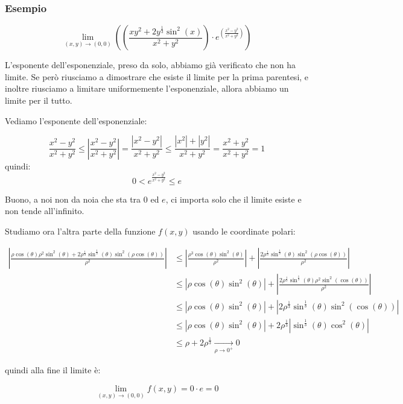 \subsubsection*{Esempio}

\[
    \lim_{ (x,y) \to (0,0) } \left( \left( \frac{xy^{2}+2y^{ \frac{1}{3}}\sin^{2}(x)}{x^{2}+y^{2}}\right) \cdot e^{ \left(\frac{x^{2}-y^{2}}{x^{2}+y^{2}}\right)} \right)
\]

L'esponente dell'esponenziale, preso da solo, abbiamo già verificato che non ha limite. Se però riusciamo a dimostrare che esiste il limite per la prima parentesi, e inoltre riusciamo a limitare uniformemente l'esponenziale, allora abbiamo un limite per il tutto.

Vediamo l'esponente dell'esponenziale:

\[
    \frac{x^{2}-y^{2}}{x^{2}+y^{2}} \le \left|\frac{x^{2}-y^{2}}{x^{2}+y^{2}}\right| = \frac{\left|x^{2}-y^{2}\right|}{x^{2}+y^{2}}  \le \frac{\left|x^{2}\right|+\left|y^{2}\right|}{x^{2}+y^{2}} = \frac{x^{2}+y^{2}}{x^{2}+y^{2}} = 1
\]
quindi:
\[
    0 < e ^{ \frac{x^{2}-y^{2}}{x^{2}+y^{2}}} \le e
\]

Buono, a noi non da noia che sta tra \(0\) ed \(e\), ci importa solo che il limite esiste e non tende all'infinito.

Studiamo ora l'altra parte della funzione \(f(x,y)\) usando le coordinate polari:

\begin{align*}
    \left| \frac{\rho\cos(\theta) \rho^{2}\sin^{2}(\theta) + 2 \rho^{\frac{1}{3}}\sin^{\frac{1}{3}}(\theta) \sin^{2}(\rho\cos(\theta))}{\rho^{2}}\right| & \le \left| \frac{\rho^{3}\cos(\theta)\sin^{2}(\theta)}{\rho^{2}}\right| + \left|\frac{2 \rho^{\frac{1}{3}}\sin^{\frac{1}{3}}(\theta) \sin^{2}(\rho\cos(\theta)) }{\rho^{2}}\right| \\
                                                                                                                                                         & \le \left| \rho\cos(\theta) \sin ^{2}(\theta)\right| + \left|\frac{2 \rho^{\frac{1}{3}} \sin^{\frac{1}{3}}(\theta) \rho^2\sin^{2}(\cos(\theta)) }{\rho^{2}}\right|                 \\
                                                                                                                                                         & \le \left| \rho\cos(\theta) \sin ^{2}(\theta)\right| + \left| 2 \rho^{\frac{1}{3}} \sin^{\frac{1}{3}}(\theta) \sin^{2}(\cos(\theta)) \right|                                       \\
                                                                                                                                                         & \le \left| \rho\cos(\theta) \sin ^{2}(\theta)\right| + 2 \rho^{ \frac{1}{3}} \left| \sin^{\frac{1}{3}}(\theta) \cos^{2}(\theta)\right|                                             \\
                                                                                                                                                         & \le \rho + 2 \rho^{ \frac{1}{3}} \xrightarrow[\rho \to 0^+]{} 0
\end{align*}

quindi alla fine il limite è:

\[
    \lim_{ (x,y) \to (0,0) } f(x,y) = 0 \cdot e = 0
\]
